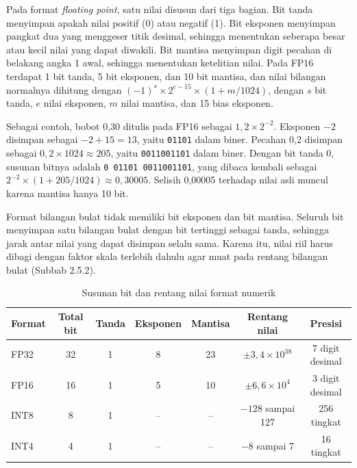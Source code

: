 Pada format \textit{floating point}, satu nilai disusun dari tiga bagian. Bit tanda menyimpan apakah nilai positif (0) atau negatif (1). Bit eksponen menyimpan pangkat dua yang menggeser titik desimal, sehingga menentukan seberapa besar atau kecil nilai yang dapat diwakili. Bit mantisa menyimpan digit pecahan di belakang angka 1 awal, sehingga menentukan ketelitian nilai. Pada FP16 terdapat 1 bit tanda, 5 bit eksponen, dan 10 bit mantisa, dan nilai bilangan normalnya dihitung dengan $(-1)^{s} \times 2^{e-15} \times (1 + m/1024)$, dengan $s$ bit tanda, $e$ nilai eksponen, $m$ nilai mantisa, dan 15 bias eksponen.

Sebagai contoh, bobot 0,30 ditulis pada FP16 sebagai $1{,}2 \times 2^{-2}$. Eksponen $-2$ disimpan sebagai $-2 + 15 = 13$, yaitu \texttt{01101} dalam biner. Pecahan 0,2 disimpan sebagai $0{,}2 \times 1024 \approx 205$, yaitu \texttt{0011001101} dalam biner. Dengan bit tanda 0, susunan bitnya adalah \texttt{0 01101 0011001101}, yang dibaca kembali sebagai $2^{-2} \times (1 + 205/1024) \approx 0{,}30005$. Selisih 0,00005 terhadap nilai asli muncul karena mantisa hanya 10 bit.

Format bilangan bulat tidak memiliki bit eksponen dan bit mantisa. Seluruh bit menyimpan satu bilangan bulat dengan bit tertinggi sebagai tanda, sehingga jarak antar nilai yang dapat disimpan selalu sama. Karena itu, nilai riil harus dibagi dengan faktor skala terlebih dahulu agar muat pada rentang bilangan bulat (Subbab 2.5.2).

\begin{table}[htbp]
  \centering
  \small
  \renewcommand{\arraystretch}{1.2}
  \caption{Susunan bit dan rentang nilai format numerik \parencite{gholami2021survey}}
  \label{tab:format-numerik}
  \setlength{\tabcolsep}{4pt}
  \begin{tabularx}{\textwidth}{@{}lcccccc@{}}
    \hline
    \textbf{Format} & \textbf{Total bit} & \textbf{Tanda} & \textbf{Eksponen} & \textbf{Mantisa} & \textbf{Rentang nilai} & \textbf{Presisi} \\
    \hline
    FP32 & 32 & 1 & 8 & 23 & $\pm 3{,}4 \times 10^{38}$ & 7 digit desimal \\
    FP16 & 16 & 1 & 5 & 10 & $\pm 6{,}6 \times 10^{4}$ & 3 digit desimal \\
    INT8 & 8 & 1 & -- & -- & $-128$ sampai 127 & 256 tingkat \\
    INT4 & 4 & 1 & -- & -- & $-8$ sampai 7 & 16 tingkat \\
    \hline
  \end{tabularx}
\end{table}

